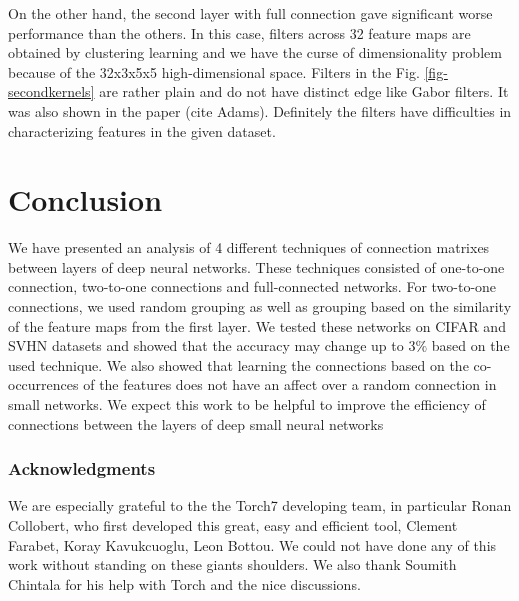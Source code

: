 \documentclass{article} %
\begin{document}
On the other hand, the second layer with full connection gave significant worse performance than the others. In this case, filters across 32 feature maps are obtained by clustering learning and we have the curse of dimensionality problem because of the 32x3x5x5 high-dimensional space. Filters in the Fig. \ref{fig-secondkernels} are rather plain and do not have distinct edge like Gabor filters. It was also shown in the paper (cite Adams). Definitely the filters have difficulties in characterizing features in the given dataset.

\section{Conclusion}
\label{sec-conc}

We have presented an analysis of 4 different techniques of connection matrixes
between layers of deep neural networks.  These techniques consisted of one-to-one connection, two-to-one connections and 
full-connected networks. For two-to-one connections, we used random grouping as well as grouping based on the 
similarity of the feature maps from the first layer. 
We tested these networks on CIFAR and SVHN datasets
and showed that the accuracy may change
up to $3\%$ based on the used technique. We also showed that learning
the connections based on the co-occurrences of  the features does not
have an affect over a random connection in small networks.
We expect this work to be helpful to improve the efficiency of connections between the layers of 
deep small neural networks


\subsubsection*{Acknowledgments}
We are especially grateful to the the Torch7 developing team, in particular Ronan Collobert, who first developed this great, easy and efficient tool, Clement Farabet, Koray Kavukcuoglu, Leon Bottou. We could not have done any of this work without standing on these giants shoulders. We also thank Soumith Chintala for his help with Torch and the nice discussions.



\end{document}

